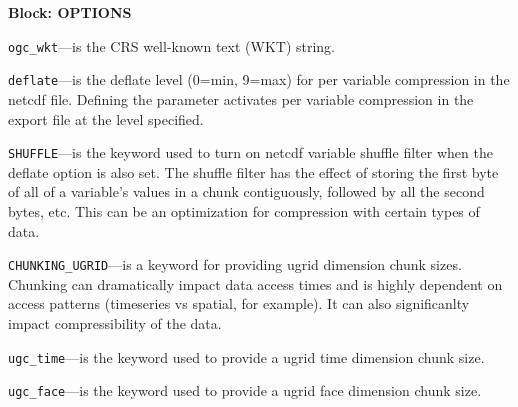 
\item \textbf{Block: OPTIONS}

\begin{description}
\item \texttt{ogc\_wkt}---is the CRS well-known text (WKT) string.

\item \texttt{deflate}---is the deflate level (0=min, 9=max) for per variable compression in the netcdf file. Defining the parameter activates per variable compression in the export file at the level specified.

\item \texttt{SHUFFLE}---is the keyword used to turn on netcdf variable shuffle filter when the deflate option is also set. The shuffle filter has the effect of storing the first byte of all of a variable's values in a chunk contiguously, followed by all the second bytes, etc. This can be an optimization for compression with certain types of data.

\item \texttt{CHUNKING\_UGRID}---is a keyword for providing ugrid dimension chunk sizes. Chunking can dramatically impact data access times and is highly dependent on access patterns (timeseries vs spatial, for example). It can also significanlty impact compressibility of the data.

\item \texttt{ugc\_time}---is the keyword used to provide a ugrid time dimension chunk size.

\item \texttt{ugc\_face}---is the keyword used to provide a ugrid face dimension chunk size.

\end{description}

